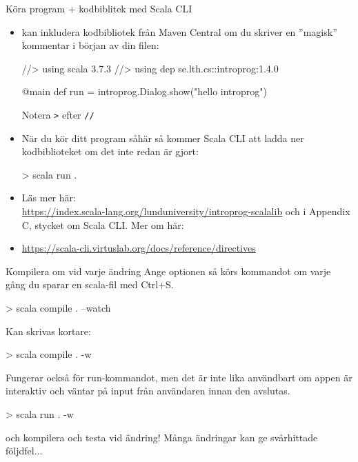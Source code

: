 \begin{Slide}{Köra program + kodbiblitek med Scala CLI}\SlideFontTiny
\begin{itemize}
\item {} kan inkludera kodbibliotek från Maven Central om du skriver en ''magisk'' kommentar i början av din filen:
\begin{Code}
//> using scala 3.7.3
//> using dep se.lth.cs::introprog:1.4.0

@main def run = introprog.Dialog.show("hello introprog")
\end{Code}
Notera \texttt{>} efter \texttt{//}

\item När du kör ditt program såhär så kommer Scala CLI att ladda ner kodbiblioteket om det inte redan är gjort:
\begin{REPLsmall}
> scala run .
\end{REPLsmall}
\item Läs mer här:\\\url{https://index.scala-lang.org/lunduniversity/introprog-scalalib} och i Appendix C, stycket om Scala CLI. Mer om  här:
\item[] \url{https://scala-cli.virtuslab.org/docs/reference/directives}
\end{itemize}

\end{Slide}

\begin{Slide}{Kompilera om vid varje ändring}\SlideFontSmall
Ange optionen  så körs kommandot om varje gång du sparar en scala-fil med Ctrl+S.
\begin{REPLsmall}
> scala compile . --watch
\end{REPLsmall}
Kan skrivas kortare:
\begin{REPLsmall}
> scala compile . -w
\end{REPLsmall}
Fungerar också för run-kommandot, men det är inte lika användbart om appen är interaktiv och väntar på input från användaren innan den avslutas. 
\begin{REPLsmall}
> scala run . -w
\end{REPLsmall}
 och kompilera och testa vid  ändring! Många ändringar kan ge svårhittade följdfel...
    
  
\end{Slide}

